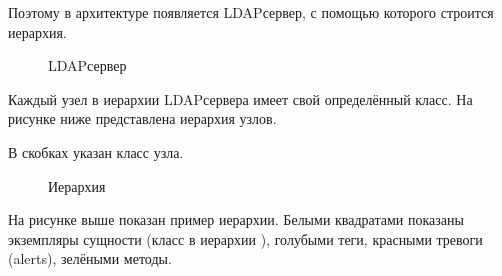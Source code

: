 \documentclass[a4paper,10pt,russian]{sphinxmanual}
\begin{document}
\sphinxAtStartPar
Поэтому в архитектуре появляется LDAP\sphinxhyphen{}сервер, с помощью которого
строится иерархия.

\begin{figure}[htbp]
\centering
\capstart

\noindent{}
\caption{LDAP\sphinxhyphen{}сервер}\label{\detokenize{architecture:id20}}\end{figure}

\sphinxAtStartPar
Каждый узел в иерархии LDAP\sphinxhyphen{}сервера имеет свой определённый класс.
На рисунке ниже представлена иерархия узлов.

\sphinxAtStartPar
В скобках указан класс узла.

\begin{figure}[htbp]
\centering
\capstart

\noindent{}
\caption{Иерархия}\label{\detokenize{architecture:id21}}\end{figure}

\sphinxAtStartPar
На рисунке выше показан пример иерархии. Белыми квадратами показаны экземпляры
сущности  (класс в иерархии \sphinxhyphen{} ), голубыми \sphinxhyphen{} теги,
красными \sphinxhyphen{} тревоги (alerts), зелёными \sphinxhyphen{} методы.
\end{document}
